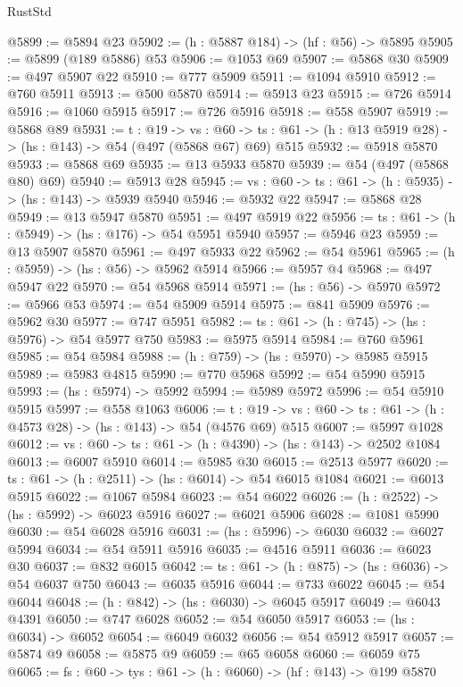 \begin{lexlean}{RustStd}
\begin{coremodule}
@5899 := @5894 @23
@5902 := (h : @5887 @184) -> (hf : @56) -> @5895
@5905 := @5899 (@189 @5886) @53
@5906 := @1053 @69
@5907 := @5868 @30
@5909 := @497 @5907 @22
@5910 := @777 @5909
@5911 := @1094 @5910
@5912 := @760 @5911
@5913 := @500 @5870
@5914 := @5913 @23
@5915 := @726 @5914
@5916 := @1060 @5915
@5917 := @726 @5916
@5918 := @558 @5907
@5919 := @5868 @89
@5931 := {t : @19} ->
  {vs : @60} -> {ts : @61} -> (h : @13 @5919 @28) -> (hs : @143) -> @54 (@497 (@5868 @67) @69) @515
@5932 := @5918 @5870
@5933 := @5868 @69
@5935 := @13 @5933 @5870
@5939 := @54 (@497 (@5868 @80) @69)
@5940 := @5913 @28
@5945 := {vs : @60} -> {ts : @61} -> (h : @5935) -> (hs : @143) -> @5939 @5940
@5946 := @5932 @22
@5947 := @5868 @28
@5949 := @13 @5947 @5870
@5951 := @497 @5919 @22
@5956 := {ts : @61} -> (h : @5949) -> (hs : @176) -> @54 @5951 @5940
@5957 := @5946 @23
@5959 := @13 @5907 @5870
@5961 := @497 @5933 @22
@5962 := @54 @5961
@5965 := (h : @5959) -> (hs : @56) -> @5962 @5914
@5966 := @5957 @4
@5968 := @497 @5947 @22
@5970 := @54 @5968 @5914
@5971 := (hs : @56) -> @5970
@5972 := @5966 @53
@5974 := @54 @5909 @5914
@5975 := @841 @5909
@5976 := @5962 @30
@5977 := @747 @5951
@5982 := {ts : @61} -> (h : @745) -> (hs : @5976) -> @54 @5977 @750
@5983 := @5975 @5914
@5984 := @760 @5961
@5985 := @54 @5984
@5988 := (h : @759) -> (hs : @5970) -> @5985 @5915
@5989 := @5983 @4815
@5990 := @770 @5968
@5992 := @54 @5990 @5915
@5993 := (hs : @5974) -> @5992
@5994 := @5989 @5972
@5996 := @54 @5910 @5915
@5997 := @558 @1063
@6006 := {t : @19} ->
  {vs : @60} -> {ts : @61} -> (h : @4573 @28) -> (hs : @143) -> @54 (@4576 @69) @515
@6007 := @5997 @1028
@6012 := {vs : @60} -> {ts : @61} -> (h : @4390) -> (hs : @143) -> @2502 @1084
@6013 := @6007 @5910
@6014 := @5985 @30
@6015 := @2513 @5977
@6020 := {ts : @61} -> (h : @2511) -> (hs : @6014) -> @54 @6015 @1084
@6021 := @6013 @5915
@6022 := @1067 @5984
@6023 := @54 @6022
@6026 := (h : @2522) -> (hs : @5992) -> @6023 @5916
@6027 := @6021 @5906
@6028 := @1081 @5990
@6030 := @54 @6028 @5916
@6031 := (hs : @5996) -> @6030
@6032 := @6027 @5994
@6034 := @54 @5911 @5916
@6035 := @4516 @5911
@6036 := @6023 @30
@6037 := @832 @6015
@6042 := {ts : @61} -> (h : @875) -> (hs : @6036) -> @54 @6037 @750
@6043 := @6035 @5916
@6044 := @733 @6022
@6045 := @54 @6044
@6048 := (h : @842) -> (hs : @6030) -> @6045 @5917
@6049 := @6043 @4391
@6050 := @747 @6028
@6052 := @54 @6050 @5917
@6053 := (hs : @6034) -> @6052
@6054 := @6049 @6032
@6056 := @54 @5912 @5917
@6057 := @5874 @9
@6058 := @5875 @9
@6059 := @65 @6058
@6060 := @6059 @75
@6065 := {fs : @60} -> {tys : @61} -> (h : @6060) -> (hf : @143) -> @199 @5870

\end{coremodule}
\end{lexlean}
